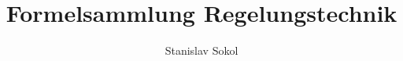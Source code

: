 \documentclass[landscape,fleqn,7pt]{scrartcl}
\author{Stanislav Sokol}
\title{Formelsammlung Regelungstechnik}
\begin{document}
\setlength{\columnsep}{1cm}
\begin{multicols}{3}
    \tableofcontents
    
    
    
    
    
    
    
    
    
    
    
    
    
\end{multicols}
\end{document}
